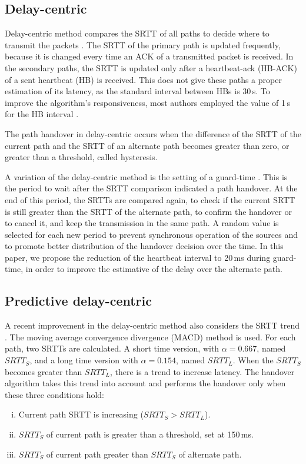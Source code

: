 \documentclass[letterpaper,10pt,oneside,conference,final]{sbrt2015}
\begin{document}
  \subsection{Delay-centric}

  Delay-centric method compares the SRTT of all paths to decide where to transmit the packets \cite{Kelly2004}. The SRTT of the primary path is updated frequently, because it is changed every time an ACK of a transmitted packet is received. In the secondary paths, the SRTT is updated only after a heartbeat-ack (HB-ACK) of a sent heartbeat (HB) is received. This does not give these paths a proper estimation of its latency, as the standard interval between HBs is 30\,s. To improve the algorithm's responsiveness, most authors employed the value of 1\,s for the HB interval \cite{Noonan2004b}\cite{Gavriloff2009}\cite{Torres2014}.

The path handover in delay-centric occurs when the difference of the SRTT of the current path and the SRTT of an alternate path becomes greater than zero, or greater than a threshold, called hysteresis.

A variation of the delay-centric method is the setting of a guard-time \cite{Leung2012}. This is the period to wait after the SRTT comparison indicated a path handover. At the end of this period, the SRTTs are compared again, to check if the current SRTT is still greater than the SRTT of the alternate path, to confirm the handover or to cancel it, and keep the transmission in the same path. A random value is selected for each new period to prevent synchronous operation of the sources and to promote better distribution of the handover decision over the time. In this paper, we propose the reduction of the heartbeat interval to 20\,ms during guard-time, in order to improve the estimative of the delay over the alternate path.

  \subsection{Predictive delay-centric}

  A recent improvement in the delay-centric method also considers the SRTT trend \cite{Torres2014}. The moving average convergence divergence (MACD) method is used. For each path, two SRTTs are calculated. A short time version, with $\alpha = 0.667$, named $SRTT_S$, and a long time version with $\alpha = 0.154$, named $SRTT_L$. When the $SRTT_S$ becomes greater than $SRTT_L$, there is a trend to increase latency. The handover algorithm takes this trend into account and performs the handover only when these three conditions hold:
\begin{enumerate}[i)]
 \item Current path SRTT is increasing ($SRTT_S > SRTT_L$).
 \item $SRTT_S$ of current path is greater than a threshold, set at 150\,ms.
 \item $SRTT_S$ of current path greater than $SRTT_S$ of alternate path.
\end{enumerate}
\end{document}
